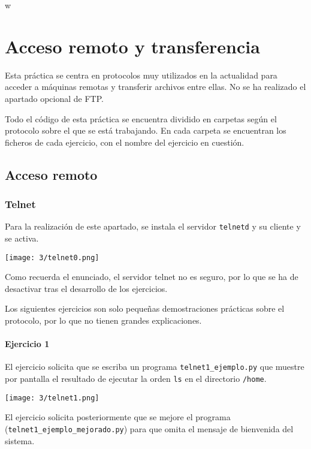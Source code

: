 w\chapter{Acceso remoto y transferencia}\label{chap:3}
Esta práctica se centra en protocolos muy utilizados en la actualidad para
acceder a máquinas remotas y transferir archivos entre ellas. No se ha
realizado el apartado opcional de FTP{.}

Todo el código de esta práctica se encuentra dividido en carpetas según
el protocolo sobre el que se está trabajando. En cada carpeta se encuentran
los ficheros de cada ejercicio, con el nombre del ejercicio en cuestión.

\section{Acceso remoto}
\subsection{Telnet}
Para la realización de este apartado, se instala el servidor \Verb#telnetd# y su cliente y
se activa.

\begin{minipage}{\linewidth}
    \centering
    \texttt{[image: 3/telnet0.png]}
    \label{fig:3/1}
\end{minipage}

Como recuerda el enunciado, el servidor telnet no es seguro, por lo que se ha de desactivar
tras el desarrollo de los ejercicios.

Los siguientes ejercicios son solo pequeñas demostraciones prácticas sobre el protocolo, por
lo que no tienen grandes explicaciones.

\subsubsection{Ejercicio 1}
El ejercicio solicita que se escriba un programa \lstinline{telnet1_ejemplo.py}
que muestre por pantalla el resultado de ejecutar la orden \lstinline{ls} en el
directorio \Verb#/home#.

\begin{minipage}{\linewidth}
    \centering
    \texttt{[image: 3/telnet1.png]}
    \label{fig:3/2}
\end{minipage}

El ejercicio solicita posteriormente que se mejore el programa \\
(\Verb#telnet1_ejemplo_mejorado.py#) para que omita el mensaje de bienvenida
del sistema.

